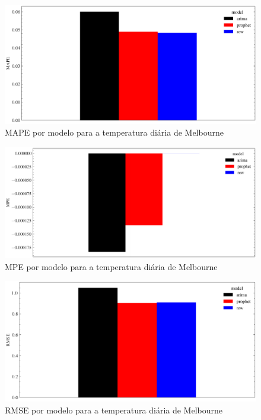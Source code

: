 \begin{figure}[!htp]
    \centering
    \includegraphics[width=5.0in]{img/temperatures_mape_comparison.pdf}
    \caption{MAPE por modelo para a temperatura diária de Melbourne}
\end{figure}

\begin{figure}[!htp]
    \centering
    \includegraphics[width=5.0in]{img/temperatures_mpe_comparison.pdf}
    \caption{MPE por modelo para a temperatura diária de Melbourne}
\end{figure}

\begin{figure}[!htp]
    \centering
    \includegraphics[width=5.0in]{img/temperatures_rmse_comparison.pdf}
    \caption{RMSE por modelo para a temperatura diária de Melbourne}
\end{figure}

